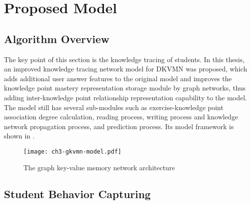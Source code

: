 \section{Proposed Model}

\subsection{Algorithm Overview}

The key point of this section is the knowledge tracing of students. In this thesis, an improved knowledge tracing network model for DKVMN was proposed, which adds additional user answer features to the original model and improves the knowledge point mastery representation storage module by graph networks, thus adding inter-knowledge point relationship representation capability to the model. The model still has several sub-modules such as exercise-knowledge point association degree calculation, reading process, writing process and knowledge network propagation process, and prediction process. Its model framework is shown in \figname{\ref{fig:ch3-gkvmn-model}}.

\begin{figure}[htbp!]
    \centering
    \texttt{[image: ch3-gkvmn-model.pdf]}
    \caption{The graph key-value memory network architecture}\label{fig:ch3-gkvmn-model}
\end{figure}

\subsection{Student Behavior Capturing}

